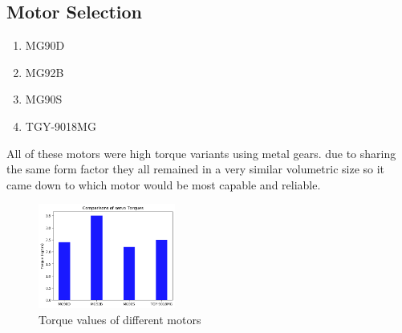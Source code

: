 \documentclass[conference]{IEEEtran}
\begin{document}
                                  
\begin{appendices}
\section{Motor Selection}

\label{appendix:MotorSelection}

    \begin{enumerate}
        \item MG90D
        \item MG92B
        \item MG90S
        \item TGY-9018MG
    \end{enumerate}
    All of these motors were high torque variants using metal gears. due to sharing the same form factor they all remained in a very similar volumetric size so it came down to which motor would be most capable and reliable.
    \begin{figure}[H]
	   \centering
       \includegraphics[width=0.4\textwidth]{Images/Motors.png}
  	   \caption{Torque values of different motors}
	   \label{fig:Motor_Torques}
    \end{figure}


\end{appendices}
\end{document}
